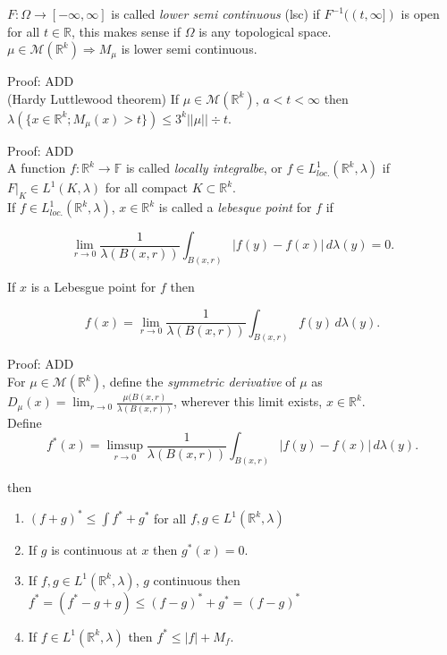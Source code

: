 \documentclass[12pt]{article}
\newcommand{\reals}[0] { \mathbb{R}}
\newcommand{\M}[0] { \mathcal{M} }
\newcommand{\Om}[0] { \Omega }
\newcommand{\rimply}[0] { \Rightarrow }
\newcommand{\rarw}[0] { \rightarrow }
\begin{document}
$F: \Om \rarw [-\infty, \infty]$ is called \emph{lower semi continuous} (lsc) if $F^{-1}((t,\infty])$ is open for all $t \in \reals$, this makes sense if $\Om$ is any topological space. \\

$\mu \in \M(\reals^k) \rimply M_\mu$ is lower semi continuous.

\noindent
Proof: ADD \\

(Hardy Luttlewood theorem) If $\mu \in \M(\reals^k)$, $a < t < \infty$ then $\lambda(\{ x \in \reals^k; M_\mu(x) > t \} ) \le 3^k ||\mu|| \div t$.

\noindent
Proof: ADD \\

A function $f : \reals^k \rarw \mathbb{F}$ is called \emph{locally integralbe}, or $f \in L^1_{loc.}(\reals^k, \lambda)$ if $F|_K \in L^1(K, \lambda)$ for all compact $K \subset \reals^k$.  \\

If $f \in L^1_{loc.}(\reals^k, \lambda)$, $x \in \reals^k$ is called a \emph{lebesque point} for $f$ if

$$
\lim_{r \rarw 0} \frac{1}{ \lambda(B(x,r))} \int_{B(x,r)} |f(y)-f(x)| \, d \lambda(y) = 0.
$$

\noindent
If $x$ is a Lebesgue point for $f$ then

$$
f(x) = \lim_{r \rarw 0} \frac{1}{ \lambda(B(x,r))} \int_{B(x,r)} f(y) \, d \lambda(y).
$$


\noindent
Proof: ADD \\




For $\mu \in \M(\reals^k)$, define the \emph{symmetric derivative} of $\mu$ as $D_\mu(x) = \lim_{r \rarw 0} \frac{\mu(B(x,r)}{\lambda(B(x,r))}$, wherever this limit exists, $x \in \reals^k$. \\



Define 
$$
    f^*(x) = \limsup_{r \rarw 0} \frac{1}{ \lambda(B(x,r))} \int_{B(x,r)} |f(y)-f(x)| \, d \lambda(y) .
$$

\noindent
then
\begin{enumerate}[1)]
\item
$(f+g)^* \le \int f^* + g^*$ for all $f,g \in L^1(\reals^k, \lambda)$
\item 
If $g$ is continuous at $x$ then $g^*(x) = 0$.
\item
If $f,g \in L^1(\reals^k, \lambda)$, $g$ continuous then $f^* = (f^* - g + g) \le (f-g)^* + g^* = (f-g)^*$
\item
If $f \in L^1(\reals^k, \lambda)$ then $f^* \le |f| + M_f$.
\end{enumerate} 
\end{document}
